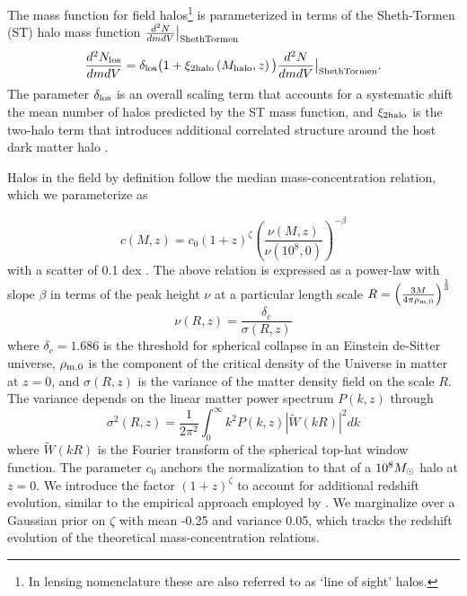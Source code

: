The mass function for field halos\footnote{In lensing nomenclature these are also referred to as `line of sight' halos.} is parameterized in terms of the Sheth-Tormen (ST) halo mass function \citep{ST99} $\frac{d^2N}{dm  dV} \big \vert_{\rm{ShethTormen}}$
\begin{equation}
\label{eqn:LOSmfunc}
\frac{d^2N_{\rm{los}}}{dm  dV} = {\delta_{\rm{los}}} \big(1+ \xi_{\rm{2halo}}\left(M_{\rm{halo}}, z\right)\big) \frac{d^2N}{dm  dV} \big \vert_{\rm{ShethTormen}}.
\end{equation}
The parameter ${\delta_{\rm{los}}}$ is an overall scaling term that accounts for a systematic shift the mean number of halos predicted by the ST mass function, and $\xi_{\rm{2halo}}$ is the two-halo term that introduces additional correlated structure around the host dark matter halo \citep{Gilman++19b}.

Halos in the field by definition follow the median mass-concentration relation, which we parameterize as 

\begin{equation}
\label{eqn:mcrelation}
c\left(M, z\right) = c_0  \left(1+z\right)^{\zeta} \left(\frac{\nu\left(M, z\right)}{\nu\left(10^8, 0\right)}\right)^{-\beta}
\end{equation}
with a scatter of 0.1 dex \citep{Dutton++14}. The above relation is expressed as a power-law with slope $\beta$ in terms of the peak height $\nu$ at a particular length scale $R = \left(\frac{3M}{4 \pi \rho_{\rm{m,0}} }\right)^\frac{1}{3}$
\begin{equation}
\nonumber\nu\left(R,z\right) = \frac{\delta_c}{\sigma \left(R,z\right)}
\end{equation}
where $\delta_c = 1.686$ is the threshold for spherical collapse in an Einstein de-Sitter universe, $\rho_{\rm{m,0}}$ is the component of the critical density of the Universe in matter at $z=0$, and $\sigma\left(R,z\right)$ is the variance of the matter density field on the scale $R$. The variance depends on the linear matter power spectrum $P\left(k,z\right)$ through
\begin{equation}
\label{eqn:variance}
\sigma^{2}\left(R,z\right) = \frac{1}{2 \pi^2}\int_{0}^{\infty} k^2 P\left(k,z\right) |\tilde{W}\left(kR\right)|^{2} dk
\end{equation}
where $\tilde{W}\left(kR\right)$ is the Fourier transform of the spherical top-hat window function. The parameter $c_0$ anchors the normalization to that of a $10^{8} {M_{\odot}}$ halo at $z=0$. We introduce the factor $\left(1+z\right)^{\zeta}$ to account for additional redshift evolution, similar to the empirical approach employed by \citet{Prada++12}. We marginalize over a Gaussian prior on $\zeta$ with mean -0.25 and variance 0.05, which tracks the redshift evolution of the theoretical mass-concentration relations. 

